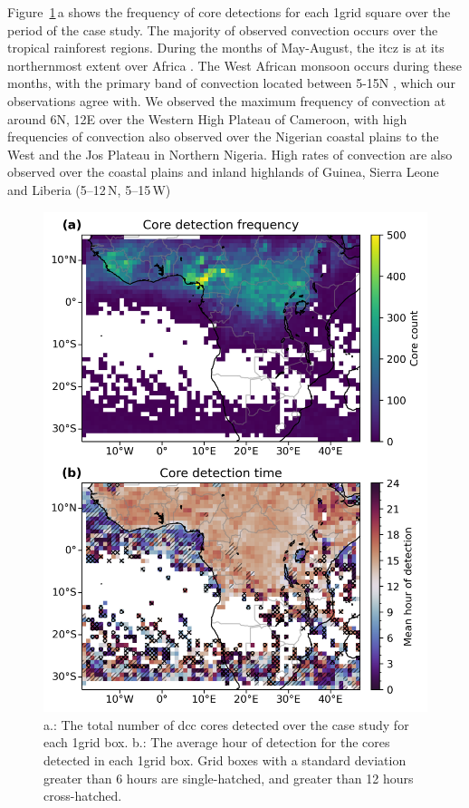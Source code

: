 Figure~\ref{fig:seviri_map_dists}\,a shows the frequency of core detections for each 1\textdegree grid square over the period of the case study. 
The majority of observed convection occurs over the tropical rainforest regions. 
During the months of May-August, the \acrfull{itcz} is at its northernmost extent over Africa \citep{nicholson_itcz_2018}. 
The West African monsoon occurs during these months, with the primary band of convection located between 5-15\textdegree N \citep{nicholson_revised_2009}, which our observations agree with. 
We observed the maximum frequency of convection at around 6\textdegree N, 12\textdegree E over the Western High Plateau of Cameroon, with high frequencies of convection also observed over the Nigerian coastal plains to the West and the Jos Plateau in Northern Nigeria. 
High rates of convection are also observed over the coastal plains and inland highlands of Guinea, Sierra Leone and Liberia (5--12\,\textdegree N, 5--15\,\textdegree W)


\begin{figure}[tp]
    \includegraphics[width=\textwidth]{figures/ch3_05.png}
    \caption[
    Number of detected cores and average hour of core detection
    ]{
    a.: The total number of \acrshort{dcc} cores detected over the case study for each 1\textdegree grid box. b.: The average hour of detection for the cores detected in each 1\textdegree grid box. Grid boxes with a standard deviation greater than 6 hours are single-hatched, and greater than 12 hours cross-hatched.
    }
    \label{fig:seviri_map_dists}
\end{figure}



